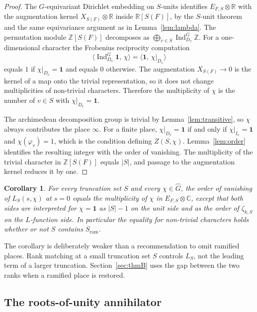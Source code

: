 \documentclass[11pt]{article}
\theoremstyle{plain}
\newtheorem{corollary}[theorem]{Corollary}
\theoremstyle{definition}
\theoremstyle{remark}
\newcommand{\Z}{\mathbb{Z}}
\newcommand{\R}{\mathbb{R}}
\newcommand{\C}{\mathbb{C}}
\newcommand{\triv}{\mathbf{1}}
\newcommand{\ram}{\mathrm{ram}}
\begin{document}
\begin{proof}
The $G$-equivariant Dirichlet embedding on $S$-units identifies $E_{F,S}\otimes\R$ with the augmentation kernel $X_{S(F)}\otimes\R$ inside $\R[S(F)]$, by the $S$-unit theorem and the same equivariance argument as in Lemma~\ref{lem:lambda}.
The permutation module $\Z[S(F)]$ decomposes as $\bigoplus_{v\in S}\operatorname{Ind}_{D_v}^{G}\Z$.
For a one-dimensional character the Frobenius reciprocity computation
\[
  \bigl\langle\operatorname{Ind}_{D_v}^{G}\triv,\,\chi\bigr\rangle
  =\bigl\langle\triv,\,\chi|_{D_v}\bigr\rangle
\]
equals $1$ if $\chi|_{D_v}=\triv$ and equals $0$ otherwise.
The augmentation $X_{S(F)}\to 0$ is the kernel of a map onto the trivial representation, so it does not change multiplicities of non-trivial characters.
Therefore the multiplicity of $\chi$ is the number of $v\in S$ with $\chi|_{D_v}=\triv$.

The archimedean decomposition group is trivial by Lemma~\ref{lem:transitive}, so $\chi$ always contributes the place $\infty$.
For a finite place, $\chi|_{D_v}=\triv$ if and only if $\chi|_{I_v}=\triv$ and $\chi(\varphi_v)=1$, which is the condition defining $Z(S,\chi)$.
Lemma~\ref{lem:order} identifies the resulting integer with the order of vanishing.
The multiplicity of the trivial character in $\Z[S(F)]$ equals $|S|$, and passage to the augmentation kernel reduces it by one.
\end{proof}

\begin{corollary}
\label{cor:match}
For every truncation set $S$ and every $\chi\in\widehat G$, the order of vanishing of $L_S(s,\chi)$ at $s=0$ equals the multiplicity of $\chi$ in $E_{F,S}\otimes\C$, except that both sides are interpreted for $\chi=\triv$ as $|S|-1$ on the unit side and as the order of $\zeta_{k,S}$ on the $L$-function side.
In particular the equality for non-trivial characters holds whether or not $S$ contains $S_{\ram}$.
\end{corollary}

The corollary is deliberately weaker than a recommendation to omit ramified places.
Rank matching at a small truncation set $S$ controls $L_S$, not the leading term of a larger truncation.
Section~\ref{sec:thmB} uses the gap between the two ranks when a ramified place is restored.

\subsection{The roots-of-unity annihilator}
\end{document}
